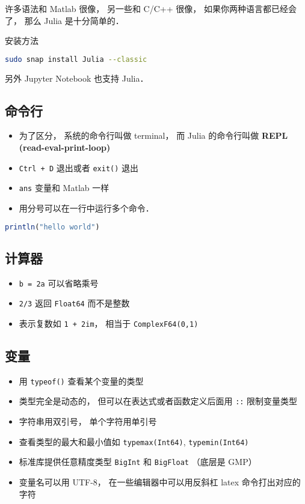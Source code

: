 
\begin{issues}
\issueDraft
\end{issues}

许多语法和 Matlab 很像， 另一些和 C/C++ 很像， 如果你两种语言都已经会了， 那么 Julia 是十分简单的．

安装方法
\begin{lstlisting}[language=bash]
sudo snap install Julia --classic
\end{lstlisting}

另外 Jupyter Notebook 也支持 Julia．

\subsection{命令行}
\begin{itemize}
\item 为了区分， 系统的命令行叫做 terminal， 而 Julia 的命令行叫做 \textbf{REPL (read-eval-print-loop)}
\item \verb|Ctrl + D| 退出或者 \verb|exit()| 退出
\item \verb|ans| 变量和 Matlab 一样
\item 用分号可以在一行中运行多个命令．
\end{itemize}

\begin{lstlisting}[language=Julia]
println("hello world")
\end{lstlisting}

\subsection{计算器}
\begin{itemize}
\item \verb|b = 2a| 可以省略乘号
\item \verb|2/3| 返回 \verb|Float64| 而不是整数
\item 表示复数如 \verb|1 + 2im|， 相当于 \verb|ComplexF64(0,1)|
\end{itemize}

\subsection{变量}
\begin{itemize}
\item 用 \verb|typeof()| 查看某个变量的类型
\item 类型完全是动态的， 但可以在表达式或者函数定义后面用 \verb|::| 限制变量类型
\item 字符串用双引号， 单个字符用单引号
\item 查看类型的最大和最小值如 \verb|typemax(Int64)|, \verb|typemin(Int64)|
\item 标准库提供任意精度类型 \verb|BigInt| 和 \verb|BigFloat| （底层是 GMP）
\item 变量名可以用 UTF-8， 在一些编辑器中可以用反斜杠 latex 命令打出对应的字符
\end{itemize}

